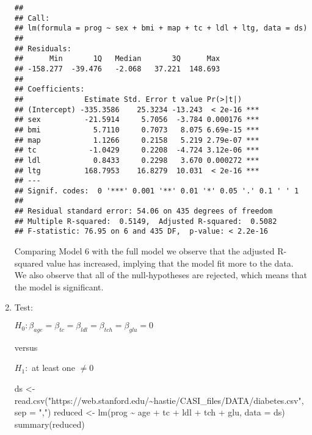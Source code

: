 \documentclass[
]{article}
\newenvironment{Shaded}{\begin{snugshade}}{\end{snugshade}}
\newcommand{\AttributeTok}[1]{\textcolor[rgb]{0.77,0.63,0.00}{#1}}
\newcommand{\FunctionTok}[1]{\textcolor[rgb]{0.00,0.00,0.00}{#1}}
\newcommand{\NormalTok}[1]{#1}
\newcommand{\OtherTok}[1]{\textcolor[rgb]{0.56,0.35,0.01}{#1}}
\newcommand{\SpecialCharTok}[1]{\textcolor[rgb]{0.00,0.00,0.00}{#1}}
\newcommand{\StringTok}[1]{\textcolor[rgb]{0.31,0.60,0.02}{#1}}
\begin{document}
\begin{enumerate}
\begin{verbatim}
## 
## Call:
## lm(formula = prog ~ sex + bmi + map + tc + ldl + ltg, data = ds)
## 
## Residuals:
##      Min       1Q   Median       3Q      Max 
## -158.277  -39.476   -2.068   37.221  148.693 
## 
## Coefficients:
##              Estimate Std. Error t value Pr(>|t|)    
## (Intercept) -335.3586    25.3234 -13.243  < 2e-16 ***
## sex          -21.5914     5.7056  -3.784 0.000176 ***
## bmi            5.7110     0.7073   8.075 6.69e-15 ***
## map            1.1266     0.2158   5.219 2.79e-07 ***
## tc            -1.0429     0.2208  -4.724 3.12e-06 ***
## ldl            0.8433     0.2298   3.670 0.000272 ***
## ltg          168.7953    16.8279  10.031  < 2e-16 ***
## ---
## Signif. codes:  0 '***' 0.001 '**' 0.01 '*' 0.05 '.' 0.1 ' ' 1
## 
## Residual standard error: 54.06 on 435 degrees of freedom
## Multiple R-squared:  0.5149,  Adjusted R-squared:  0.5082 
## F-statistic: 76.95 on 6 and 435 DF,  p-value: < 2.2e-16
\end{verbatim}

  Comparing Model 6 with the full model we observe that the adjusted
  R-squared value has increased, implying that the model fit more to the
  data. We also observe that all of the null-hypotheses are rejected,
  which means that the model is significant.
\item
  Test:

  \(H_0: \beta_{age} = \beta_{tc} =\beta_{ldl} =\beta_{tch} =\beta_{glu} = 0\)

  versus

  \(H_1:\) at least one \(\ne 0\)

\begin{Shaded}
\begin{Highlighting}[]
\NormalTok{ds }\OtherTok{\textless{}{-}} \FunctionTok{read.csv}\NormalTok{(}\StringTok{"https://web.stanford.edu/\textasciitilde{}hastie/CASI\_files/DATA/diabetes.csv"}\NormalTok{, }\AttributeTok{sep =} \StringTok{","}\NormalTok{)}
\NormalTok{reduced }\OtherTok{\textless{}{-}} \FunctionTok{lm}\NormalTok{(prog }\SpecialCharTok{\textasciitilde{}}\NormalTok{ age }\SpecialCharTok{+}\NormalTok{ tc }\SpecialCharTok{+}\NormalTok{ ldl }\SpecialCharTok{+}\NormalTok{ tch }\SpecialCharTok{+}\NormalTok{ glu, }\AttributeTok{data =}\NormalTok{ ds)}
\FunctionTok{summary}\NormalTok{(reduced)}
\end{Highlighting}
\end{Shaded}


\end{enumerate}
\end{document}
